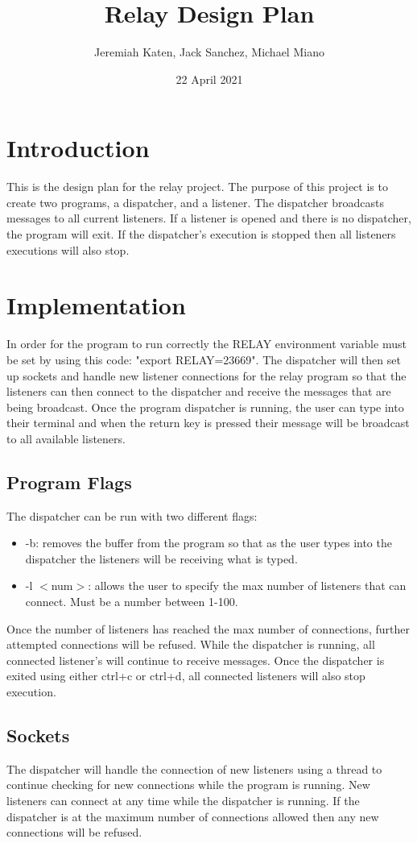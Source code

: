 \documentclass{article}
\title{Relay Design Plan}
\author{Jeremiah Katen, Jack Sanchez, Michael Miano}
\date{22 April 2021}
\begin{document}
\maketitle

\section{Introduction}
This is the design plan for the relay project. The purpose of this project is to create two programs, a dispatcher, and a listener. The dispatcher broadcasts messages to all current listeners. If a listener is opened and there is no dispatcher, the program will exit. If the dispatcher's execution is stopped then all listeners executions will also stop.

\section{Implementation}
In order for the program to run correctly the RELAY environment variable must be set by using this code: "export RELAY=23669". The dispatcher will then set up sockets and handle new listener connections for the relay program so that the listeners can then connect to the dispatcher and receive the messages that are being broadcast. Once the program dispatcher is running, the user can type into their terminal and when the return key is pressed their message will be broadcast to all available listeners.
\subsection{Program Flags}
The dispatcher can be run with two different flags:
\begin{itemize}
    \item -b: removes the buffer from the program so that as the user types into the dispatcher the listeners will be receiving what is typed.
    \item -l $<$num$>$: allows the user to specify the max number of listeners that can connect. Must be a number between 1-100.
\end{itemize}
Once the number of listeners has reached the max number of connections, further attempted connections will be refused. While the dispatcher is running, all connected listener's will continue to receive messages. Once the dispatcher is exited using either ctrl+c or ctrl+d, all connected listeners will also stop execution.

\subsection{Sockets}
The dispatcher will handle the connection of new listeners using a thread to continue checking for new connections while the program is running. New listeners can connect at any time while the dispatcher is running. If the dispatcher is at the maximum number of connections allowed then any new connections will be refused.
\end{document}

